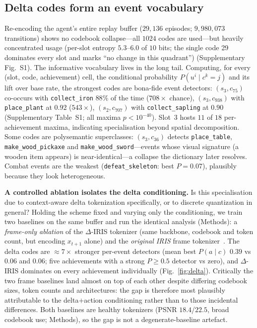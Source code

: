\documentclass[pdflatex,sn-mathphys-num]{sn-jnl}%
\theoremstyle{thmstyleone}%
\theoremstyle{thmstyletwo}%
\theoremstyle{thmstylethree}%
\newcommand{\deltairis}{$\Delta$-IRIS}
\newcommand{\code}[2]{(s_{#1},c_{#2})}
\newcommand{\achname}[1]{\texttt{#1}}
\begin{document}
\subsection{Delta codes form an event vocabulary}\label{sec:res-vocab}
Re-encoding the agent's entire replay buffer ($29{,}136$ episodes; $9{,}980{,}073$ transitions) shows no codebook collapse---all $1024$ codes are used---but heavily concentrated usage (per-slot entropy $5.3$--$6.0$ of $10$ bits; the single code 29 dominates every slot and marks ``no change in this quadrant'') (Supplementary Fig.~S1). The informative vocabulary lives in the long tail. Computing, for every (slot, code, achievement) cell, the conditional probability $P(u^i \mid c^k{=}j)$ and its lift over base rate, the strongest codes are bona-fide event detectors: $\code{3}{75}$ co-occurs with \achname{collect\_iron} $88\%$ of the time ($708\times$ chance), $\code{3}{938}$ with \achname{place\_plant} at $0.92$ ($543\times$), $\code{2}{707}$ with \achname{collect\_sapling} at $0.90$ (Supplementary Table~S1; all maxima $p<10^{-40}$). Slot~3 hosts $11$ of $18$ per-achievement maxima, indicating specialisation beyond spatial decomposition. Some codes are polysemantic superclasses: $\code{3}{36}$ detects \achname{place\_table}, \achname{make\_wood\_pickaxe} and \achname{make\_wood\_sword}---events whose visual signature (a wooden item appears) is near-identical---a collapse the dictionary later resolves. Combat events are the weakest (\achname{defeat\_skeleton}: best $P{=}0.07$), plausibly because they look heterogeneous.

\textbf{A controlled ablation isolates the delta conditioning.} Is this specialisation due to context-aware delta tokenization specifically, or to discrete quantization in general? Holding the scheme fixed and varying only the conditioning, we train two baselines on the same buffer and run the identical analysis (Methods): a \emph{frame-only ablation} of the \deltairis{} tokenizer (same backbone, codebook and token count, but encoding $x_{t+1}$ alone) and the \emph{original IRIS} frame tokenizer~\cite{iris2023}. The delta codes are $\approx 7\times$ stronger per-event detectors (mean best $P(a\mid c)$ $0.39$ vs $0.06$ and $0.06$; five achievements with a strong $P{\geq}0.5$ detector vs zero), and \deltairis{} dominates on every achievement individually (Fig.~\ref{fig:delta}). Critically the two frame baselines land almost on top of each other despite differing codebook sizes, token counts and architectures: the gap is therefore most plausibly attributable to the delta$+$action conditioning rather than to those incidental differences. Both baselines are healthy tokenizers (PSNR $18.4$/$22.5$, broad codebook use; Methods), so the gap is not a degenerate-baseline artefact.
\end{document}
